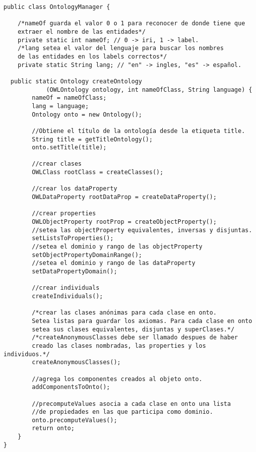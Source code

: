 \begin{verbatim}
public class OntologyManager {

    /*nameOf guarda el valor 0 o 1 para reconocer de donde tiene que
    extraer el nombre de las entidades*/
    private static int nameOf; // 0 -> iri, 1 -> label.
    /*lang setea el valor del lenguaje para buscar los nombres
    de las entidades en los labels correctos*/
    private static String lang; // "en" -> ingles, "es" -> español.

  public static Ontology createOntology
            (OWLOntology ontology, int nameOfClass, String language) {
        nameOf = nameOfClass;
        lang = language;
        Ontology onto = new Ontology();
        
        //Obtiene el título de la ontología desde la etiqueta title.
        String title = getTitleOntology();
        onto.setTitle(title);
        
        //crear clases
        OWLClass rootClass = createClasses();

        //crear los dataProperty
        OWLDataProperty rootDataProp = createDataProperty();
        
        //crear properties
        OWLObjectProperty rootProp = createObjectProperty();
        //setea las objectProperty equivalentes, inversas y disjuntas.
        setListsToProperties();
        //setea el dominio y rango de las objectProperty
        setObjectPropertyDomainRange();
        //setea el dominio y rango de las dataProperty
        setDataPropertyDomain();
        
        //crear individuals
        createIndividuals();
        
        /*crear las clases anónimas para cada clase en onto.
        Setea listas para guardar los axiomas. Para cada clase en onto
        setea sus clases equivalentes, disjuntas y superClases.*/
        /*createAnonymousClasses debe ser llamado despues de haber
        creado las clases nombradas, las properties y los individuos.*/
        createAnonymousClasses();
        
        //agrega los componentes creados al objeto onto.
        addComponentsToOnto();
        
        //precomputeValues asocia a cada clase en onto una lista 
        //de propiedades en las que participa como dominio.
        onto.precomputeValues();
        return onto;
    }
}
\end{verbatim}

